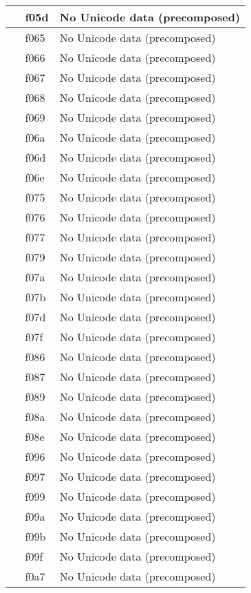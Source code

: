 \documentclass[12pt,letterpaper,openany]{book}
\begin{document}
\begin{center}
\begin{supertabular}{|m{0.25in}|m{0.5in}|m{4in}|}
			 & f05d & No Unicode data (precomposed)\\\hline
			 & f065 & No Unicode data (precomposed)\\\hline
			 & f066 & No Unicode data (precomposed)\\\hline
			 & f067 & No Unicode data (precomposed)\\\hline
			 & f068 & No Unicode data (precomposed)\\\hline
			 & f069 & No Unicode data (precomposed)\\\hline
			 & f06a & No Unicode data (precomposed)\\\hline
			 & f06d & No Unicode data (precomposed)\\\hline
			 & f06e & No Unicode data (precomposed)\\\hline
			 & f075 & No Unicode data (precomposed)\\\hline
			 & f076 & No Unicode data (precomposed)\\\hline
			 & f077 & No Unicode data (precomposed)\\\hline
			 & f079 & No Unicode data (precomposed)\\\hline
			 & f07a & No Unicode data (precomposed)\\\hline
			 & f07b & No Unicode data (precomposed)\\\hline
			 & f07d & No Unicode data (precomposed)\\\hline
			 & f07f & No Unicode data (precomposed)\\\hline
			 & f086 & No Unicode data (precomposed)\\\hline
			 & f087 & No Unicode data (precomposed)\\\hline
			 & f089 & No Unicode data (precomposed)\\\hline
			 & f08a & No Unicode data (precomposed)\\\hline
			 & f08e & No Unicode data (precomposed)\\\hline
			 & f096 & No Unicode data (precomposed)\\\hline
			 & f097 & No Unicode data (precomposed)\\\hline
			 & f099 & No Unicode data (precomposed)\\\hline
			 & f09a & No Unicode data (precomposed)\\\hline
			 & f09b & No Unicode data (precomposed)\\\hline
			 & f09f & No Unicode data (precomposed)\\\hline
			 & f0a7 & No Unicode data (precomposed)\\\hline

\end{supertabular}
\end{center}
\end{document}
